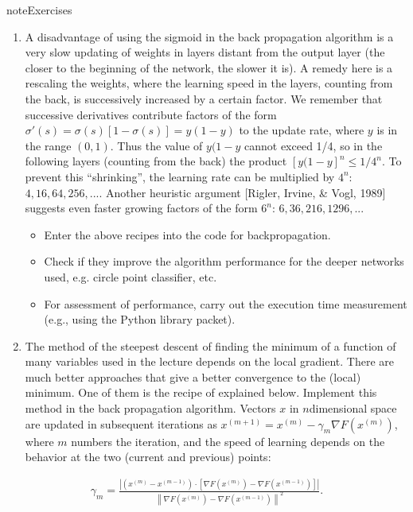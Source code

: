 \documentclass[letterpaper,10pt,english]{jupyterBook}
\begin{document}
\begin{sphinxadmonition}{note}{Exercises}
\begin{enumerate}
\item {} 
\sphinxAtStartPar
{}
A disadvantage of using the sigmoid in the back propagation algorithm is a very slow updating of weights in layers distant from the output layer (the closer to the beginning of the network, the slower it is). A remedy here is a re\sphinxhyphen{}scaling the weights, where the learning speed in the layers, counting from the back, is successively increased by a certain factor. We remember that successive derivatives contribute factors of the form \( \sigma '(s) = \sigma (s) [1- \sigma (s)] = y (1-y) \) to the update rate, where \( y \) is in the range \( (0, 1) \). Thus the value of \( y (1-y \) cannot exceed 1/4, so in the following layers (counting from the back) the product \( [y (1-y] ^ n \le 1/4 ^ n\).
To prevent this “shrinking”, the learning rate can be multiplied by \( 4 ^ n \): \( 4, 16, 64, 256, ... \). Another heuristic argument {[}Rigler, Irvine, \& Vogl, 1989{]} suggests even faster growing factors of the form \( 6 ^ n \): \( 6, 36, 216, 1296, ... \)
\begin{itemize}
\item {} 
\sphinxAtStartPar
Enter the above recipes into the code for backpropagation.

\item {} 
\sphinxAtStartPar
Check if they improve the algorithm performance for the deeper networks used, e.g. circle point classifier, etc.

\item {} 
\sphinxAtStartPar
For assessment of performance, carry out the execution time measurement (e.g., using the Python  library packet).

\end{itemize}

\item {} 
\sphinxAtStartPar
{}
The method of the steepest descent of finding the minimum of a function of many variables used in the lecture depends on the local gradient. There are much better approaches that give a better convergence to the (local) minimum. One of them is the recipe of  explained below. Implement this method in the back propagation algorithm. Vectors \(x\) in \(n\)\sphinxhyphen{}dimensional space are updated in subsequent iterations as \( x^{(m + 1)} = x^{(m)} - \gamma_m \nabla F (x^{(m)})\),
where \(m\) numbers the iteration, and the speed of learning depends on the behavior at the two (current and previous) points:

\end{enumerate}
\begin{equation*}
\begin{split} \gamma _ {m} = \frac {\left | \left (x^{(m)}-x^{(m-1)} \right) \cdot
\left [\nabla F (x^{(m)}) - \nabla F (x^{(m-1)}) \right] \right |}
{\left \| \nabla F (x^{(m)}) - \nabla F (x^{(m-1)}) \right \| ^ {2}}.
\end{split}
\end{equation*}\end{sphinxadmonition}
\end{document}
